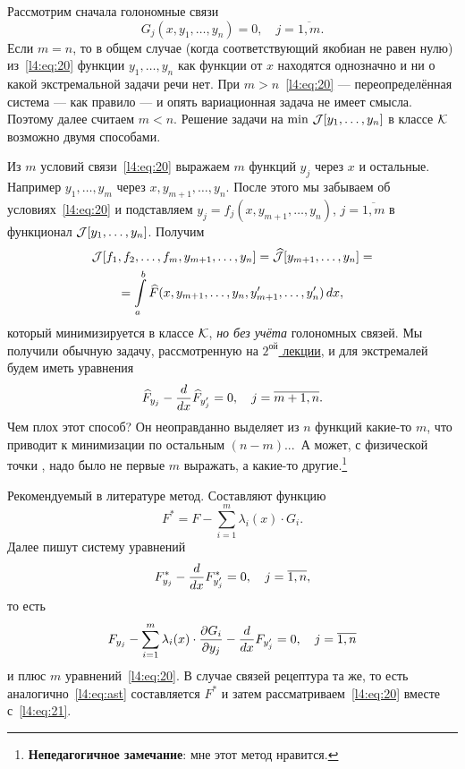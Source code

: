 \begin{enumerateD}
	Рассмотрим сначала голономные связи
	\begin{equation}
		\label{l4:eq:20}
		 G_j(x,y_1,\ldots,y_n)=0,\quad j=\overline{1,m}.
	\end{equation}
	Если $m=n$, то в общем случае (когда соответствующий якобиан не равен нулю) из~\eqref{l4:eq:20} функции $y_1,\ldots,y_n$ как функции от $x$ находятся однозначно и ни о какой экстремальной задачи речи нет. При $m>n$~\eqref{l4:eq:20} --- переопределённая система --- как правило --- и опять вариационная задача не имеет смысла. Поэтому далее считаем $m<n$. Решение задачи на $\min\,\mathcal{J}[y_1,\ldots,y_n]$ в классе $\mathcal{K}$ возможно двумя способами. 
	\begin{enumerateD}
		\item Из $m$ условий связи~\eqref{l4:eq:20} выражаем $m$ функций $y_j$ через $x$ и остальные. Например $y_1,\ldots,y_m$ через $x,y_{m+1},\ldots,y_n$. После этого мы забываем об условиях~\eqref{l4:eq:20} и подставляем $y_j=f_j(x,y_{m+1},\ldots,y_{n})$, $j=\overline{1,m}$ в функционал $\mathcal{J}[y_1,\ldots,y_n]$. Получим
		\begin{multline*}
			\mathcal{J}[f_1,f_2,\ldots,f_m,y_{m+1},\ldots,y_n]=\widehat{\mathcal{J}}[y_{m+1},\ldots,y_n]=\\=\int\limits_a^b \widehat{F}(x,y_{m+1},\ldots,y_n,y'_{m+1},\ldots,y'_n)\,dx,
		\end{multline*}  
		который минимизируется в классе $\mathcal{K}$, \emph{но без учёта} голономных связей. Мы получили обычную задачу, рассмотренную на \hyperref[lecture2]{$2^{\text{ой}}$  лекции}, и для экстремалей будем иметь уравнения
		\begin{equation*}
			 \widehat{F}_{y_j}-\frac{d}{dx}\widehat{F}_{y'_j}=0,\quad j=\overline{m+1,n}.
		\end{equation*} 
		Чем плох этот способ? Он неоправданно выделяет из $n$ функций какие-то $m$, что приводит к минимизации по остальным $(n-m)${\mb ...}\  А может{\mb,} с физической точки {\mb,} надо было не первые $m$ выражать, а какие-то другие.\footnote{\textbf{{\mb Непедагогичное} замечание}: мне этот метод нравится.}
		\item Рекомендуемый в литературе метод. Составляют функцию
		\begin{equation}
			\label{l4:eq:ast}
			 F^{\ast}=F-\sum\limits_{i=1}^{m}\lambda_i(x)\cdot G_i.\tag{$\ast$}
		\end{equation} 
		Далее пишут систему уравнений
		\begin{equation}
			\label{l4:eq:21}
			 F^{\ast}_{y_j}-\frac{d}{dx}F^{\ast}_{y'_j}=0,\quad j=\overline{1,n},
		\end{equation}
		то есть 
		\begin{equation*}
			 F_{y_j}-\sum\limits_{i=1}^m\lambda_i(x)\cdot\frac{\partial G_i}{\partial y_j}-\frac{d}{dx}F_{y_j'}=0,\quad j=\overline{1,n}
		\end{equation*}
		и плюс $m$ уравнений~\eqref{l4:eq:20}.
		В случае {} связей рецептура та же, то есть аналогично~\eqref{l4:eq:ast} составляется $	F^{\ast}$ и затем рассматриваем~\eqref{l4:eq:20} вместе с~\eqref{l4:eq:21}.
	\end{enumerateD}
\end{enumerateD}

